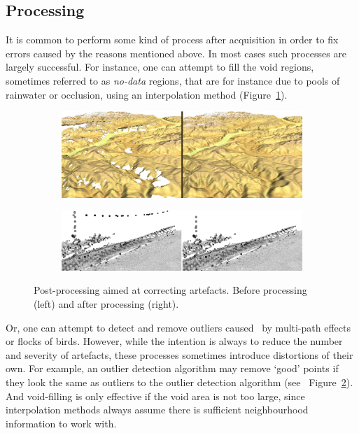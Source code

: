 \subsection{Processing}
It is common to perform some kind of process after acquisition in order to fix errors caused by the reasons mentioned above. 
In most cases such processes are largely successful. 
For instance, one can attempt to fill the void regions, sometimes referred to as \emph{no-data} regions, that are for instance due to pools of rainwater or occlusion, using an interpolation method (Figure~\ref{fig:voidfill}).
\begin{figure}
	\centering
	\begin{subfigure}{0.45\linewidth}
		\includegraphics[width=\textwidth]{figs/srtm_trento_voidfill.png}
		\label{fig:voidfill}
	\end{subfigure}
	\quad
	\begin{subfigure}{0.45\linewidth}
		\includegraphics[width=\textwidth]{figs/ourlier-detection-wrong.png}
				\label{fig:outlier-wrong}
	\end{subfigure}
	\caption{Post-processing aimed at correcting artefacts. Before processing (left) and after processing (right).}%
	\label{fig:processing}
\end{figure}
Or, one can attempt to detect and remove outliers caused \eg\ by multi-path effects or flocks of birds. 
However, while the intention is always to reduce the number and severity of artefacts, these processes sometimes introduce distortions of their own.
For example, an outlier detection algorithm may remove `good' points if they look the same as outliers to the outlier detection algorithm (see \eg\ Figure~\ref{fig:outlier-wrong}).
And void-filling is only effective if the void area is not too large, since interpolation methods always assume there is sufficient neighbourhood information to work with.


